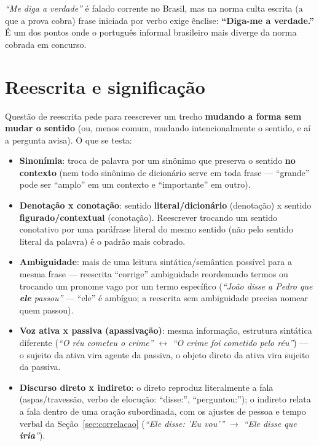 \begin{cuidado}
\textit{“Me diga a verdade”} é falado corrente no Brasil, mas na norma culta
escrita (a que a prova cobra) frase iniciada por verbo exige ênclise:
\textbf{“Diga-me a verdade.”} É um dos pontos onde o português informal
brasileiro mais diverge da norma cobrada em concurso.
\end{cuidado}

\section{Reescrita e significação}

\begin{conceito}
Questão de reescrita pede para reescrever um trecho \textbf{mudando a forma
sem mudar o sentido} (ou, menos comum, mudando intencionalmente o sentido, e
aí a pergunta avisa). O que se testa:

\begin{itemize}
\item \textbf{Sinonímia}: troca de palavra por um sinônimo que preserva o
sentido \textbf{no contexto} (nem todo sinônimo de dicionário serve em toda
frase --- “grande” pode ser “amplo” em um contexto e “importante” em outro).
\item \textbf{Denotação x conotação}: sentido \textbf{literal/dicionário}
(denotação) x sentido \textbf{figurado/contextual} (conotação). Reescrever
trocando um sentido conotativo por uma paráfrase literal do mesmo sentido
(não pelo sentido literal da palavra) é o padrão mais cobrado.
\item \textbf{Ambiguidade}: mais de uma leitura sintática/semântica possível
para a mesma frase --- reescrita “corrige” ambiguidade reordenando termos ou
trocando um pronome vago por um termo específico (\textit{“João disse a
Pedro que \textbf{ele} passou”} --- “ele” é ambíguo; a reescrita sem
ambiguidade precisa nomear quem passou).
\item \textbf{Voz ativa x passiva (apassivação)}: mesma informação,
estrutura sintática diferente (\textit{“O réu cometeu o crime”} $\leftrightarrow$
\textit{“O crime foi cometido pelo réu”}) --- o sujeito da ativa vira agente
da passiva, o objeto direto da ativa vira sujeito da passiva.
\item \textbf{Discurso direto x indireto}: o direto reproduz literalmente a
fala (aspas/travessão, verbo de elocução: “disse:”, “perguntou:”); o
indireto relata a fala dentro de uma oração subordinada, com os ajustes de
pessoa e tempo verbal da Seção~\ref{sec:correlacao} (\textit{“Ele disse: 'Eu
vou'”} $\to$ \textit{“Ele disse que \textbf{iria}”}).
\end{itemize}
\end{conceito}

